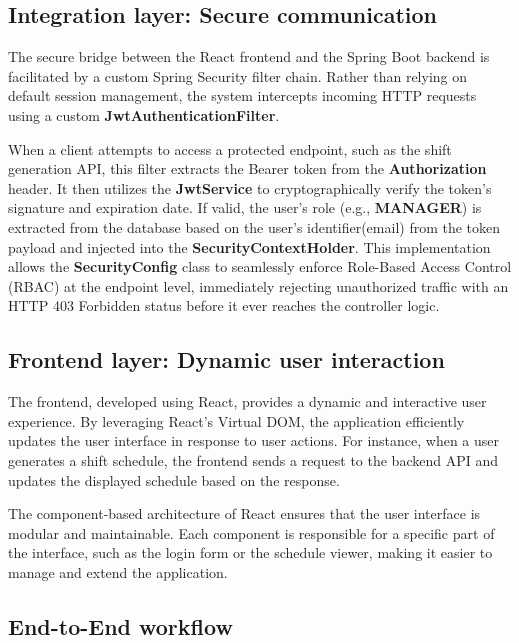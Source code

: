 \subsection{Integration layer: Secure communication}
\label{subsec:ch3sec2subsec3}

\par The secure bridge between the React frontend and the Spring Boot backend is facilitated by a custom Spring Security filter chain. Rather than relying on default session management, the system intercepts incoming HTTP requests using a custom \textbf{JwtAuthenticationFilter}.

\par When a client attempts to access a protected endpoint, such as the shift generation API, this filter extracts the Bearer token from the \textbf{Authorization} header. It then utilizes the \textbf{JwtService} to cryptographically verify the token's signature and expiration date. If valid, the user's role (e.g., \textbf{MANAGER}) is extracted from the database based on the user's identifier(email) from the token payload and injected into the \textbf{SecurityContextHolder}. This implementation allows the \textbf{SecurityConfig} class to seamlessly enforce Role-Based Access Control (RBAC) at the endpoint level, immediately rejecting unauthorized traffic with an HTTP 403 Forbidden status before it ever reaches the controller logic.

\subsection{Frontend layer: Dynamic user interaction}
\label{subsec:ch3sec2subsec4}

\par The frontend, developed using React, provides a dynamic and interactive user experience. By leveraging React's Virtual DOM, the application efficiently updates the user interface in response to user actions. For instance, when a user generates a shift schedule, the frontend sends a request to the backend API and updates the displayed schedule based on the response.

\par The component-based architecture of React ensures that the user interface is modular and maintainable. Each component is responsible for a specific part of the interface, such as the login form or the schedule viewer, making it easier to manage and extend the application.

\subsection{End-to-End workflow}
\label{subsec:ch3sec2subsec5}

